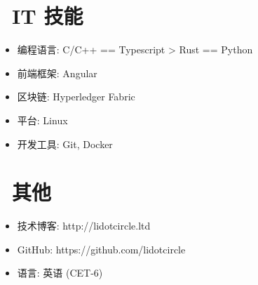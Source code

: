 \documentclass{resume}
\begin{document}
\section{\faCogs\ IT 技能}
\begin{itemize}[parsep=0.5ex]
  \item 编程语言: C/C++ == Typescript > Rust == Python
  \item 前端框架: Angular
  \item 区块链: Hyperledger Fabric
  \item 平台: Linux
  \item 开发工具: Git, Docker
\end{itemize}

\section{\faInfo\ 其他}
\begin{itemize}[parsep=0.5ex]
  \item 技术博客: http://lidotcircle.ltd
  \item GitHub: https://github.com/lidotcircle
  \item 语言: 英语 (CET-6)
\end{itemize}

%
%
\end{document}
